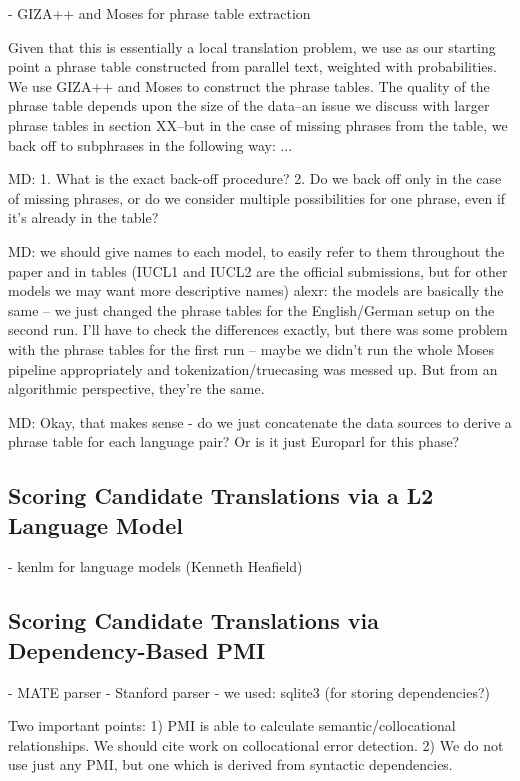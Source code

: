 \documentclass[11pt]{article}
\begin{document}
- GIZA++ and Moses for phrase table extraction

Given that this is essentially a local translation problem, we use as our starting point a phrase table constructed from parallel text, weighted with probabilities.  We use GIZA++ \cite{och:ney:00} and Moses \cite{koehn:hoang:ea:07} to construct the phrase tables.  The quality of the phrase table depends upon the size of the data--an issue we discuss with larger phrase tables in section XX--but in the case of missing phrases from the table, we back off to subphrases in the following way: ...

MD: 1. What is the exact back-off procedure? 2. Do we back off only in the case of missing phrases, or do we consider multiple possibilities for one phrase, even if it’s already in the table?

MD: we should give names to each model, to easily refer to them throughout the paper and in tables (IUCL1 and IUCL2 are the official submissions, but for other models we may want more descriptive names)
alexr: the models are basically the same -- we just changed the phrase tables for the English/German setup on the second run. I'll have to check the differences exactly, but there was some problem with the phrase tables for the first run -- maybe we didn't run the whole Moses pipeline appropriately and tokenization/truecasing was messed up. But from an algorithmic perspective, they're the same.

MD: Okay, that makes sense - do we just concatenate the data sources to derive a phrase table for each language pair?  Or is it just Europarl for this phase?

\subsection{Scoring Candidate Translations via a L2 Language Model}
- kenlm for language models (Kenneth Heafield)

\subsection{Scoring Candidate Translations via Dependency-Based PMI}

- MATE parser
- Stanford parser
- we used: sqlite3 (for storing dependencies?)

Two important points: 1) PMI is able to calculate semantic/collocational relationships.  We should cite work on collocational error detection.  2) We do not use just any PMI, but one which is derived from syntactic dependencies.
\end{document}
